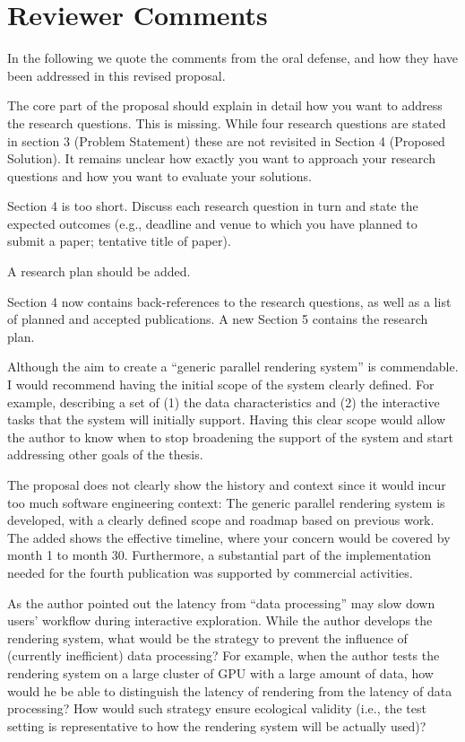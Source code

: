 \appendix
\section{Reviewer Comments}

In the following we quote the comments from the oral defense, and how they have
been addressed in this revised proposal.

\begin{displayquote} The core part of the proposal should explain in detail how
you want to address the research questions. This is missing. While four research
questions are stated in section 3 (Problem Statement) these are not revisited in
Section 4 (Proposed Solution). It remains unclear how exactly you want to
approach your research questions and how you want to evaluate your solutions.

Section 4 is too short. Discuss each research question in turn and state the
expected outcomes (e.g., deadline and venue to which you have planned to submit
a paper; tentative title of paper).

A research plan should be added.
\end{displayquote}

Section 4 now contains back-references to the research questions, as well as a
list of planned and accepted publications. A new Section 5 contains the research
plan.


\begin{displayquote} Although the aim to create a “generic parallel rendering
system” is commendable. I would recommend having the initial scope of the system
clearly defined. For example, describing a set of (1) the data characteristics
and (2) the interactive tasks that the system will initially support. Having
this clear scope would allow the author to know when to stop broadening the
support of the system and start addressing other goals of the thesis.
\end{displayquote}

The proposal does not clearly show the history and context since it would incur
too much software engineering context: The generic parallel rendering system is
developed, with a clearly defined scope and roadmap based on previous work. The
added  shows the effective timeline, where your concern would be
covered by month 1 to month 30. Furthermore, a substantial part of the
implementation needed for the fourth publication was supported by commercial
activities.

\begin{displayquote} As the author pointed out the latency from “data
processing” may slow down users’ workflow  during interactive exploration.
While the author develops the rendering system, what would be the strategy to
prevent the influence of (currently inefficient) data processing? For example,
when the author tests the rendering system on a large cluster of GPU with a
large amount of data, how would he be able to distinguish the latency of
rendering from the latency of data processing? How would such strategy ensure
ecological validity (i.e., the test setting is representative to how the
rendering system will be actually used)?
\end{displayquote}

